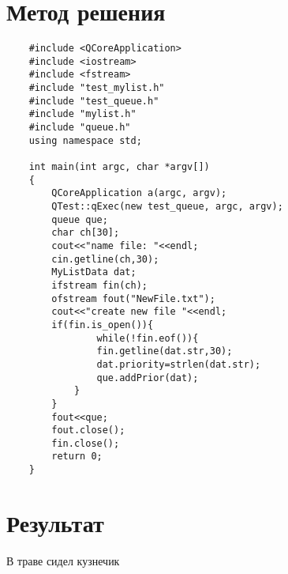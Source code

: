\documentclass[12pt]{report}
\begin{document}
\section{Метод решения}
	\lstset{language=C++,style=customc}          %
	\begin{lstlisting}                
	#include <QCoreApplication>
	#include <iostream>
	#include <fstream>
	#include "test_mylist.h"
	#include "test_queue.h"
	#include "mylist.h"
	#include "queue.h"
	using namespace std;
	
	int main(int argc, char *argv[])
	{
		QCoreApplication a(argc, argv);
		QTest::qExec(new test_queue, argc, argv);	
		queue que;
		char ch[30];
		cout<<"name file: "<<endl;
		cin.getline(ch,30);
		MyListData dat;
		ifstream fin(ch);
		ofstream fout("NewFile.txt");
		cout<<"create new file "<<endl;
		if(fin.is_open()){
				while(!fin.eof()){
				fin.getline(dat.str,30);
				dat.priority=strlen(dat.str);
				que.addPrior(dat);
			}
		}
		fout<<que;
		fout.close();
		fin.close();
		return 0;
	}
	\end{lstlisting}                  
	


\section{Результат}
	
	В траве сидел кузнечик
\printbibliography
\end{document}
